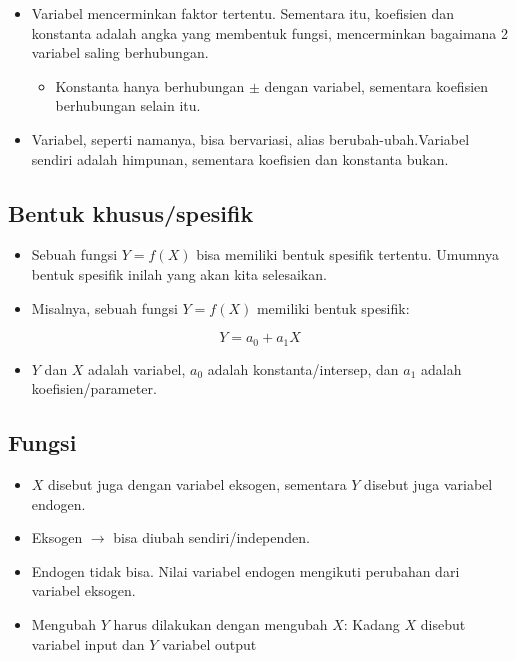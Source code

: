 \documentclass[
  letterpaper,
  DIV=11,
  numbers=noendperiod]{scrartcl}
\providecommand{\tightlist}{%
  \setlength{\itemsep}{0pt}\setlength{\parskip}{0pt}}\usepackage{longtable,booktabs,array}
\begin{document}
\begin{itemize}
\item
  Variabel mencerminkan faktor tertentu. Sementara itu, koefisien dan
  konstanta adalah angka yang membentuk fungsi, mencerminkan bagaimana 2
  variabel saling berhubungan.

  \begin{itemize}
  \tightlist
  \item
    Konstanta hanya berhubungan \(\pm\) dengan variabel, sementara
    koefisien berhubungan selain itu.
  \end{itemize}
\item
  Variabel, seperti namanya, bisa bervariasi, alias
  berubah-ubah.Variabel sendiri adalah himpunan, sementara koefisien dan
  konstanta bukan.
\end{itemize}

\subsection{Bentuk khusus/spesifik}\label{bentuk-khususspesifik}

\begin{itemize}
\item
  Sebuah fungsi \(Y=f(X)\) bisa memiliki bentuk spesifik tertentu.
  Umumnya bentuk spesifik inilah yang akan kita selesaikan.
\item
  Misalnya, sebuah fungsi \(Y=f(X)\) memiliki bentuk spesifik:
\end{itemize}

\[
Y=a_0+a_1X
\]

\begin{itemize}
\tightlist
\item
  \(Y\) dan \(X\) adalah variabel, \(a_0\) adalah konstanta/intersep,
  dan \(a_1\) adalah koefisien/parameter.
\end{itemize}

\subsection{Fungsi}\label{fungsi}

\begin{itemize}
\item
  \(X\) disebut juga dengan variabel eksogen, sementara \(Y\) disebut
  juga variabel endogen.
\item
  Eksogen \(\rightarrow\) bisa diubah sendiri/independen.
\item
  Endogen tidak bisa. Nilai variabel endogen mengikuti perubahan dari
  variabel eksogen.
\item
  Mengubah \(Y\) harus dilakukan dengan mengubah \(X\): Kadang \(X\)
  disebut variabel input dan \(Y\) variabel output
\end{itemize}
\end{document}
